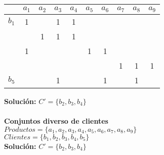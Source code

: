 \documentclass[11pt]{article}
\begin{document}
\begin{table}[h]
\centering
\begin{tabular}{c|c|c|c|c|c|c|c|c|c|}
\cline{2-10}
                                                    & $a_1$ & $a_2$ & $a_3$ & $a_4$ & $a_5$ & $a_6$ & $a_7$ & $a_8$ & $a_9$ \\ \hline
\multicolumn{1}{|c|}{$b_1$}                         & 1     &       & 1     & 1     &       &       &       &       &       \\ \hline
\rowcolor[HTML]{9AFF99} 
\multicolumn{1}{|l|}{\cellcolor[HTML]{9AFF99}$b_2$} &       & 1     & 1     & 1     &       &       &       &       &       \\ \hline
\rowcolor[HTML]{9AFF99} 
\multicolumn{1}{|l|}{\cellcolor[HTML]{9AFF99}$b_3$} & 1     &       &       &       & 1     & 1     &       &       &       \\ \hline
\rowcolor[HTML]{9AFF99} 
\multicolumn{1}{|c|}{\cellcolor[HTML]{9AFF99}$b_4$} &       &       &       &       &       &       & 1     & 1     & 1     \\ \hline
\multicolumn{1}{|c|}{$b_5$}                         &       &       & 1     &       &       & 1     &       & 1     &       \\ \hline
\end{tabular}
\end{table}


\textbf{Solución: } $C' = \{ b_2, b_3, b_4 \}$ \\ \\
\textbf{Conjuntos diverso de clientes} \\
$Productos = \{a_1, a_2, a_3, a_4, a_5, a_6, a_7, a_8, a_9\}$ \\
$Clientes = \{b_1, b_2, b_3, b_4, b_5 \}$ \\
\textbf{Solución: } $C' = \{ b_2, b_3, b_4 \}$ 
\end{document}
